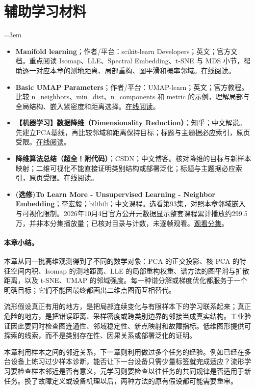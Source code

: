 \section*{辅助学习材料}
\begingroup
\emergencystretch=3em
\begin{itemize}
\item \textbf{Manifold learning}；作者/平台：scikit-learn Developers；英文；官方文档。重点阅读 Isomap、LLE、Spectral Embedding、t-SNE 与 MDS 小节，帮助逐一对应本章的测地距离、局部重构、图平滑和概率邻域。\href{https://scikit-learn.org/stable/modules/manifold.html}{在线阅读}。
\item \textbf{Basic UMAP Parameters}；作者/平台：UMAP-learn；英文；官方教程。比较 n\_neighbors、min\_dist、n\_components 和 metric 的示例，理解局部与全局结构、嵌入紧密度和距离选择。\href{https://umap-learn.readthedocs.io/en/latest/parameters.html}{在线阅读}。
\item \textbf{【机器学习】数据降维（Dimensionality Reduction）}；知乎；中文解说。先建立PCA基线，再比较邻域和距离保持目标；标题与主题据必应索引，原页受限。\href{https://zhuanlan.zhihu.com/p/342129669}{在线阅读}。
\item \textbf{降维算法总结（超全！附代码）}；CSDN；中文博客。核对降维的目标与新样本映射；二维可视化不能直接证明类别结构或部署泛化；标题与主题据必应索引，原页受限。\href{https://blog.csdn.net/SeafyLiang/article/details/118701759}{在线阅读}。
\item \textbf{(选修)To Learn More - Unsupervised Learning - Neighbor Embedding}；李宏毅；bilibili；中文课程。选看第93集，对照本章邻域嵌入与可视化限制。2026年10月4日官方公开元数据显示整套课程累计播放约299.5万，并非本分集播放量；已核对目录与计数，未逐帧观看。\href{https://www.bilibili.com/video/BV1Wv411h7kN/?p=93}{观看分集}。
\end{itemize}
\endgroup
\paragraph{本章小结。}
本章从同一批高维观测得到了不同的数学对象：PCA 的正交投影、核 PCA 的特征空间内积、Isomap 的测地距离、LLE 的局部重构权重、谱方法的图平滑与扩散距离，以及 t-SNE、UMAP 的邻域强度。每一种谱分解或梯度优化都服务于一个明确目标；它们不能因最终都画出二维点图而互相替代。

流形假设真正有用的地方，是把局部连续变化与有限样本下的学习联系起来；真正危险的地方，是把错误距离、采样密度或跨类别边界的邻接当成真实结构。工业验证因此要同时检查图连通性、邻域稳定性、新点映射和故障指标。低维图形提供可探索的线索，而不是类别存在性、因果关系或部署泛化的证明。

本章利用样本之间的邻近关系，下一章则利用做过多个任务的经验。例如已经在多台设备上练习过少样本诊断，能否让下一台设备只需少量标签就完成适应？流形学习要检查样本邻近是否有意义，元学习则要检查以往任务的共同规律是否适用于新任务。换了故障定义或设备机理以后，两种方法的原有假设都可能需要重审。
